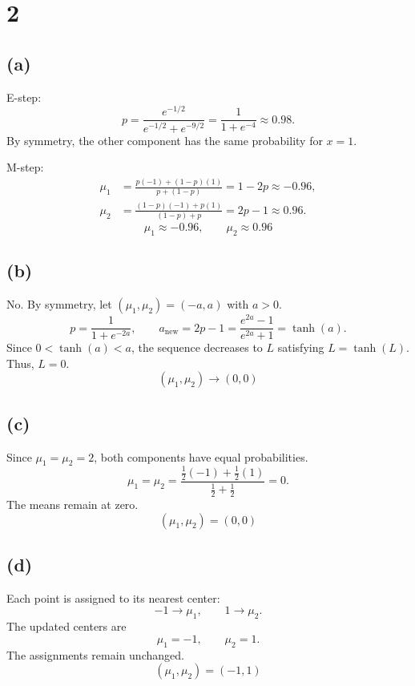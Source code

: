 \documentclass[11pt]{article}
\begin{document}
\section*{2}

\subsection*{(a)}

E-step:
\[
p=\frac{e^{-1/2}}{e^{-1/2}+e^{-9/2}}
=\frac{1}{1+e^{-4}}\approx0.98.
\]
By symmetry, the other component has the same probability for $x=1$.

M-step:
\begin{align*}
\mu_1
&=\frac{p(-1)+(1-p)(1)}{p+(1-p)}
=1-2p\approx-0.96,\\
\mu_2
&=\frac{(1-p)(-1)+p(1)}{(1-p)+p}
=2p-1\approx0.96.
\end{align*}
\[
\boxed{\mu_1\approx-0.96,\qquad\mu_2\approx0.96}
\]

\subsection*{(b)}

No. By symmetry, let $(\mu_1,\mu_2)=(-a,a)$ with $a>0$.
\[
p=\frac{1}{1+e^{-2a}},
\qquad
a_{\text{new}}=2p-1
=\frac{e^{2a}-1}{e^{2a}+1}
=\tanh(a).
\]
Since $0<\tanh(a)<a$, the sequence decreases to $L$ satisfying $L=\tanh(L)$. Thus, $L=0$.
\[
\boxed{(\mu_1,\mu_2)\longrightarrow(0,0)}
\]

\subsection*{(c)}

Since $\mu_1=\mu_2=2$, both components have equal probabilities.
\[
\mu_1=\mu_2
=\frac{\frac12(-1)+\frac12(1)}
{\frac12+\frac12}=0.
\]
The means remain at zero.
\[
\boxed{(\mu_1,\mu_2)=(0,0)}
\]

\subsection*{(d)}

Each point is assigned to its nearest center:
\[
-1\rightarrow\mu_1,\qquad
1\rightarrow\mu_2.
\]
The updated centers are
\[
\mu_1=-1,\qquad\mu_2=1.
\]
The assignments remain unchanged.
\[
\boxed{(\mu_1,\mu_2)=(-1,1)}
\]
\end{document}

